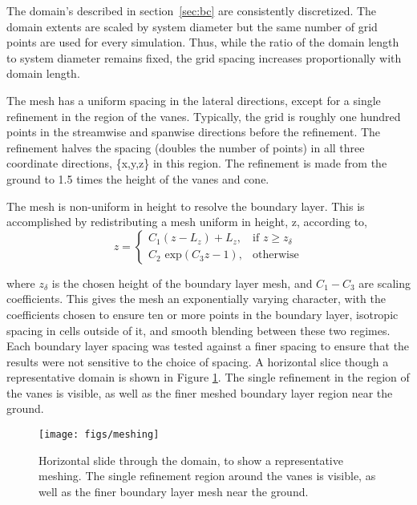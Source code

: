 %
%
The domain's described in section~\ref{sec:bc} are
consistently discretized. The domain extents
are scaled by system diameter but the same number of grid points are used
for every simulation. Thus, while the ratio of the domain length to system
diameter remains fixed, the grid spacing increases proportionally with
domain length. 

The mesh has a uniform spacing in the lateral directions, except for a
single refinement in the region of the vanes. Typically, the grid is 
roughly one hundred points in the streamwise and spanwise directions
before the refinement. The refinement halves the spacing (doubles the
number of points) in all three
coordinate directions, \{x,y,z\} in this region. The refinement is made
from the ground to 1.5 times the height of the vanes and cone. 

The mesh is non-uniform in height to
resolve the boundary layer. This is accomplished by redistributing a
mesh uniform in height, z, according to,
\begin{equation}
 z = \begin{cases} C_1(z-L_z)+L_z,& \text{if } z \geq z_\delta\\
      C_2 \text{ exp}(C_3 z - 1),                 & \text{otherwise}
     \end{cases}
\end{equation}

where $z_\delta$ is the chosen height of the boundary layer mesh, and
$C_1-C_3$ are scaling coefficients. This gives the mesh an exponentially
varying character, with the coefficients chosen to ensure ten or more
points in the boundary layer, isotropic spacing in cells outside of
it, and smooth blending between these two regimes. Each boundary layer
spacing was tested against a finer spacing to ensure that the results
were not sensitive to the choice of spacing. A horizontal slice though a
representative domain is shown in Figure \ref{fig:meshing}. The single
refinement in the region of the vanes is visible, as well as the finer
meshed boundary layer region near the ground. 

  \begin{figure}[!htb]
    \begin{center}
     \texttt{[image: figs/meshing]}
     \caption{Horizontal slide through the domain, to show a
     representative meshing. The single refinement region around the
     vanes is visible, as well as the finer boundary layer mesh near the
     ground.}
     \label{fig:meshing}
    \end{center}
  \end{figure}


